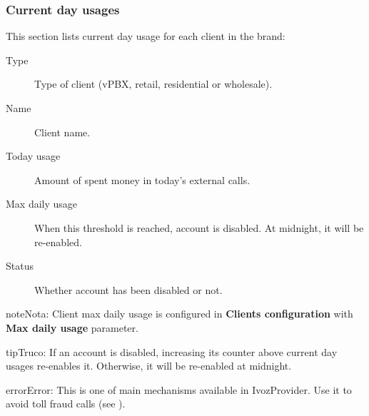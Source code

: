 \documentclass[letterpaper,10pt,spanish]{sphinxmanual}
\begin{document}
\subsubsection{Current day usages}
\label{administration_portal/brand/billing/current_day_usages:current-day-usages}\label{administration_portal/brand/billing/current_day_usages::doc}
This section lists current day usage for each client in the brand:
\begin{description}
\item[{Type}] \leavevmode{}\label{administration_portal/brand/billing/current_day_usages:term-type}
Type of client (vPBX, retail, residential or wholesale).

\item[{Name}] \leavevmode{}\label{administration_portal/brand/billing/current_day_usages:term-name}
Client name.

\item[{Today usage}] \leavevmode{}\label{administration_portal/brand/billing/current_day_usages:term-today-usage}
Amount of spent money in today's external calls.

\item[{Max daily usage}] \leavevmode{}\label{administration_portal/brand/billing/current_day_usages:term-max-daily-usage}
When this threshold is reached, account is disabled. At midnight, it will be re-enabled.

\item[{Status}] \leavevmode{}\label{administration_portal/brand/billing/current_day_usages:term-status}
Whether account has been disabled or not.

\end{description}

\begin{notice}{note}{Nota:}
Client max daily usage is configured in \textbf{Clients configuration} with \textbf{Max daily usage} parameter.
\end{notice}

\begin{notice}{tip}{Truco:}
If an account is disabled, increasing its counter above current day usages re-enables it. Otherwise, it will be
re-enabled at midnight.
\end{notice}

\begin{notice}{error}{Error:}
This is one of main  mechanisms available in IvozProvider. Use it to avoid toll fraud calls
(see {\hyperref[security_and_maintenance/security/current_day_max_usage:current\string-day\string-max\string-usage]{}}).
\end{notice}
\end{document}
